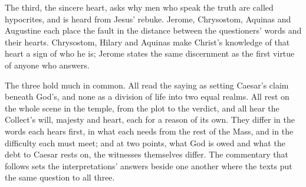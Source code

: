 The third, the sincere heart, asks why men who speak the truth are called
hypocrites, and is heard from Jesus' rebuke. Jerome, Chrysostom, Aquinas and
Augustine each place the fault in the distance between the questioners'
words and their hearts. Chrysostom, Hilary and Aquinas make Christ's knowledge
of that heart a sign of who he is; Jerome states the same discernment as the
first virtue of anyone who answers.

The three hold much in common. All read the saying as setting Caesar's claim
beneath God's, and none as a division of life into two equal realms. All rest
on the whole scene in the temple, from the plot to the verdict, and all hear
the Collect's will, majesty and heart, each for a reason of its own. They
differ in the words each hears first, in what each needs from the rest of the
Mass, and in the difficulty each must meet; and at two points, what God is
owed and what the debt to Caesar rests on, the witnesses themselves differ. The
commentary that follows sets the interpretations' answers beside one another
where the texts put the same question to all three.
